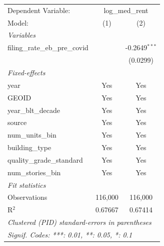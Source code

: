 \begingroup
\centering
\begin{tabular}{lcc}
   \tabularnewline \midrule \midrule
   Dependent Variable: & \multicolumn{2}{c}{log\_med\_rent}\\
   Model:                           & (1)     & (2)\\  
   \midrule
   \emph{Variables}\\
   filing\_rate\_eb\_pre\_covid     &         & -0.2649$^{***}$\\   
                                    &         & (0.0299)\\   
   \midrule
   \emph{Fixed-effects}\\
   year                             & Yes     & Yes\\  
   GEOID                            & Yes     & Yes\\  
   year\_blt\_decade                & Yes     & Yes\\  
   source                           & Yes     & Yes\\  
   num\_units\_bin                  & Yes     & Yes\\  
   building\_type                   & Yes     & Yes\\  
   quality\_grade\_standard         & Yes     & Yes\\  
   num\_stories\_bin                & Yes     & Yes\\  
   \midrule
   \emph{Fit statistics}\\
   Observations                     & 116,000 & 116,000\\  
   R$^2$                            & 0.67667 & 0.67414\\  
   \midrule \midrule
   \multicolumn{3}{l}{\emph{Clustered (PID) standard-errors in parentheses}}\\
   \multicolumn{3}{l}{\emph{Signif. Codes: ***: 0.01, **: 0.05, *: 0.1}}\\
\end{tabular}
\par\endgroup
